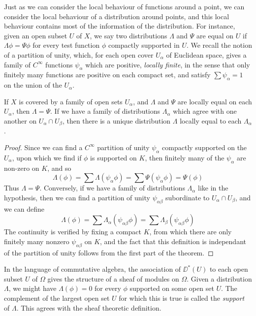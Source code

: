 Just as we can consider the local behaviour of functions around a point, we can consider the local behaviour of a distribution around points, and this local behaviour contains most of the information of the distribution. For instance, given an open subset $U$ of $X$, we say two distributions $\Lambda$ and $\Psi$ are equal on $U$ if $\Lambda \phi = \Psi \phi$ for every test function $\phi$ compactly supported in $U$. We recall the notion of a partition of unity, which, for each open cover $U_\alpha$ of Euclidean space, gives a family of $C^\infty$ functions $\psi_\alpha$ which are positive, {\it locally finite}, in the sense that only finitely many functions are positive on each compact set, and satisfy $\sum \psi_\alpha = 1$ on the union of the $U_\alpha$.

\begin{theorem}
    If $X$ is covered by a family of open sets $U_\alpha$, and $\Lambda$ and $\Psi$ are locally equal on each $U_\alpha$, then $\Lambda = \Psi$. If we have a family of distributions $\Lambda_\alpha$ which agree with one another on $U_\alpha \cap U_\beta$, then there is a unique distribution $\Lambda$ locally equal to each $\Lambda_\alpha$.
\end{theorem}
\begin{proof}
    Since we can find a $C^\infty$ partition of unity $\psi_\alpha$ compactly supported on the $U_\alpha$, upon which we find if $\phi$ is supported on $K$, then finitely many of the $\psi_\alpha$ are non-zero on $K$, and so
    \[ \Lambda(\phi) = \sum \Lambda(\psi_\alpha \phi) = \sum \Psi(\psi_\alpha \phi) = \Psi(\phi) \]
    Thus $\Lambda = \Psi$. Conversely, if we have a family of distributions $\Lambda_\alpha$ like in the hypothesis, then we can find a partition of unity $\psi_{\alpha \beta}$ subordinate to $U_\alpha \cap U_\beta$, and we can define
    \[ \Lambda(\phi) = \sum \Lambda_\alpha(\psi_{\alpha \beta} \phi) = \sum \Lambda_\beta(\psi_{\alpha \beta} \phi) \]
    The continuity is verified by fixing a compact $K$, from which there are only finitely many nonzero $\psi_{\alpha \beta}$ on $K$, and the fact that this definition is independant of the partition of unity follows from the first part of the theorem.
\end{proof}

In the language of commutative algebra, the association of $\DD^*(U)$ to each open subset $U$ of $\Omega$ gives the structure of a sheaf of modules on $\Omega$. Given a distribution $\Lambda$, we might have $\Lambda(\phi) = 0$ for every $\phi$ supported on some open set $U$. The complement of the largest open set $U$ for which this is true is called the \emph{support} of $\Lambda$. This agrees with the sheaf theoretic definition.

